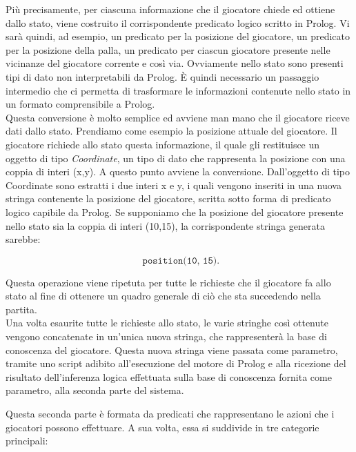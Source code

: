 Pi\`{u} precisamente, per ciascuna informazione che il giocatore chiede ed ottiene dallo stato, viene costruito il corrispondente predicato logico scritto in Prolog. Vi sar\`{a} quindi, ad esempio, un predicato per la posizione del giocatore, un predicato per la posizione della palla, un predicato per ciascun giocatore presente nelle vicinanze del giocatore corrente e cos\`{i} via. Ovviamente nello stato sono presenti tipi di dato non interpretabili da Prolog. \`{E} quindi necessario un passaggio intermedio che ci permetta di trasformare le informazioni contenute nello stato in un formato comprensibile a Prolog. \\
Questa conversione \`{e} molto semplice ed avviene man mano che il giocatore riceve dati dallo stato. Prendiamo come esempio la posizione attuale del giocatore. Il giocatore richiede allo stato questa informazione, il quale gli restituisce un oggetto di tipo \emph{Coordinate}, un tipo di dato che rappresenta la posizione con una coppia di interi (x,y). A questo punto avviene la conversione. Dall'oggetto di tipo Coordinate sono estratti i due interi x e y, i quali vengono inseriti in una nuova stringa contenente la posizione del giocatore, scritta sotto forma di predicato logico capibile da Prolog. Se supponiamo che la posizione del giocatore presente nello stato sia la coppia di interi (10,15), la corrispondente stringa generata sarebbe: 

\begin{equation*}
	\texttt{ position(10, 15).} 
\end{equation*}

Questa operazione viene ripetuta per tutte le richieste che il giocatore fa allo stato al fine di ottenere un quadro generale di ci\`{o} che sta succedendo nella partita.\\
Una volta esaurite tutte le richieste allo stato, le varie stringhe cos\`{i} ottenute vengono concatenate in un'unica nuova stringa, che rappresenterà la base di conoscenza del giocatore. Questa nuova stringa viene passata come parametro, tramite uno script adibito all'esecuzione del motore di Prolog e alla ricezione del risultato dell'inferenza logica effettuata sulla base di conoscenza fornita come parametro, alla seconda parte del sistema.

Questa seconda parte \`{e} formata da predicati che rappresentano le azioni che i giocatori possono effettuare. A sua volta, essa si suddivide in tre categorie principali:


